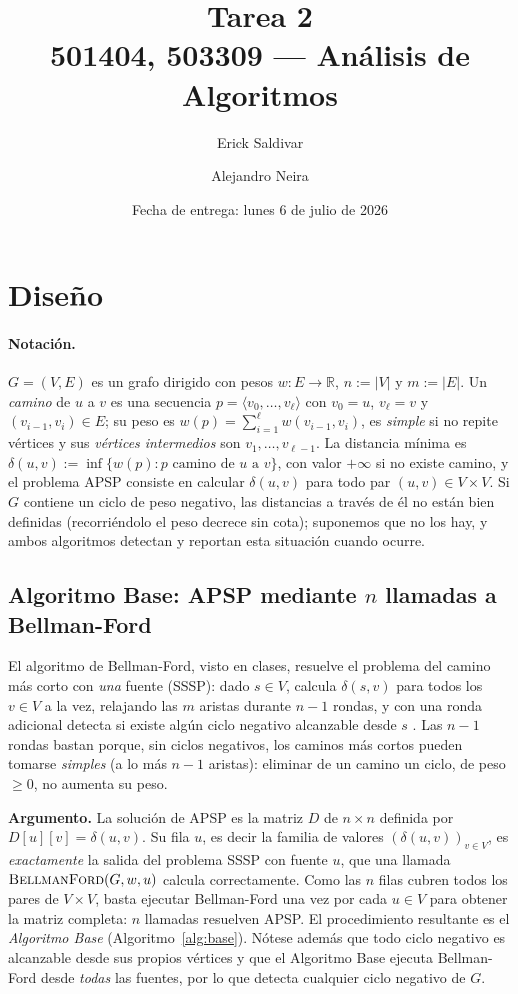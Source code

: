 \documentclass[11pt]{article}
\title{Tarea 2\\[2mm] \large 501404, 503309 --- Análisis de Algoritmos}
\author{Erick Saldivar \and Alejandro Neira}
\date{Fecha de entrega: lunes 6 de julio de 2026}
\begin{document}
\maketitle

\section{Diseño}

\paragraph{Notación.}
$G=(V,E)$ es un grafo dirigido con pesos $w\colon E\to\mathbb{R}$,
$n:=|V|$ y $m:=|E|$. Un \emph{camino} de $u$ a $v$ es una secuencia
$p=\langle v_0,\dots,v_\ell\rangle$ con $v_0=u$, $v_\ell=v$ y
$(v_{i-1},v_i)\in E$; su peso es $w(p)=\sum_{i=1}^{\ell}w(v_{i-1},v_i)$, es
\emph{simple} si no repite vértices y sus \emph{vértices intermedios} son
$v_1,\dots,v_{\ell-1}$. La distancia mínima es
$\delta(u,v):=\inf\{w(p):p\text{ camino de }u\text{ a }v\}$, con valor
$+\infty$ si no existe camino, y el problema APSP consiste en calcular
$\delta(u,v)$ para todo par $(u,v)\in V\times V$. Si $G$ contiene un ciclo
de peso negativo, las distancias a través de él no están bien definidas
(recorriéndolo el peso decrece sin cota); suponemos que no los hay, y ambos
algoritmos detectan y reportan esta situación cuando ocurre.

\subsection{Algoritmo Base: APSP mediante $n$ llamadas a Bellman-Ford}
\label{sec:base}

El algoritmo de Bellman-Ford, visto en clases, resuelve el problema del
camino más corto con \emph{una} fuente (SSSP): dado $s\in V$, calcula
$\delta(s,v)$ para todos los $v\in V$ a la vez, relajando las $m$ aristas
durante $n-1$ rondas, y con una ronda adicional detecta si existe algún
ciclo negativo alcanzable desde $s$ \cite[cap.~24]{clrs}. Las $n-1$ rondas
bastan porque, sin ciclos negativos, los caminos más cortos pueden tomarse
\emph{simples} (a lo más $n-1$ aristas): eliminar de un camino un ciclo, de
peso $\ge 0$, no aumenta su peso.

\textbf{Argumento.} La solución de APSP es la matriz $D$ de $n\times n$
definida por $D[u][v]=\delta(u,v)$. Su fila $u$, es decir la familia de
valores $(\delta(u,v))_{v\in V}$, es \emph{exactamente} la salida del
problema SSSP con fuente $u$, que una llamada $\textsc{BellmanFord}(G,w,u)$
calcula correctamente. Como las $n$ filas cubren todos los pares de
$V\times V$, basta ejecutar Bellman-Ford una vez por cada $u\in V$ para
obtener la matriz completa: $n$ llamadas resuelven APSP. El procedimiento
resultante es el \emph{Algoritmo Base} (Algoritmo~\ref{alg:base}). Nótese
además que todo ciclo negativo es alcanzable desde sus propios vértices y
que el Algoritmo Base ejecuta Bellman-Ford desde \emph{todas} las fuentes,
por lo que detecta cualquier ciclo negativo de $G$.
\end{document}
